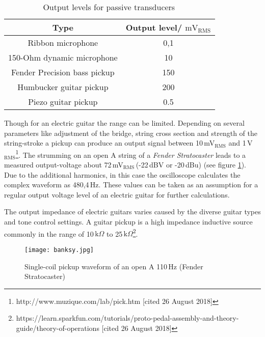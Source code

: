 \begin{table}[H]
\begin{center}
\begin{tabular}{|c|c|}
\hline 
\textbf{Type} & \textbf{Output level/ $\mathrm{mV}_{\mathrm{RMS}}$} \\ 
\hline 
\hline
Ribbon microphone & 0,1 \\ 
\hline 
150-Ohm dynamic microphone & 10 \\ 
\hline 
Fender Precision bass pickup & 150 \\ 
\hline 
Humbucker guitar pickup & 200 \\ 
\hline 
Piezo guitar pickup & 0.5 \\ 
\hline 
\end{tabular} 
\caption{Output levels for passive transducers\,\cite{Winer:2012}}
\end{center}
\label{tab:LineLevels}
\end{table}


Though for an electric guitar the range can be limited.
Depending on several parameters like adjustment of the bridge, string cross section and strength of the string-stroke a pickup can produce an output signal between 10\,mV$_{\mathrm{RMS}}$ and 1\,V$_{\mathrm{RMS}}$\footnote{http://www.muzique.com/lab/pick.htm [cited 26 August 2018]}.
The strumming on an open A string of a \textit{Fender Stratocaster} leads to a measured output-voltage about 72\,mV$_{\mathrm{RMS}}$\,(-22\,dBV or -20\,dBu) (see figure \ref{fig:singleCoilVoltage}). Due to the additional harmonics, in this case the oscilloscope calculates the complex waveform as 480,4\,Hz. 
These values can be taken as an assumption for a regular output voltage level of an electric guitar for further calculations.


The output impedance of electric guitars varies caused by the diverse guitar types and tone control settings.
A guitar pickup is a high impedance inductive source commonly in the range of 10\,$\mathrm{k}\Omega$ to 25\,$\mathrm{k}\Omega$\footnote{https://learn.sparkfun.com/tutorials/proto-pedal-assembly-and-theory-guide/theory-of-operations [cited 26 August 2018]}.


\begin{figure}[H]
	\centering \texttt{[image: banksy.jpg]}
	\caption[singleCoilVoltage]{Single-coil pickup waveform of an open A 110\,Hz (Fender Stratocaster)\,\cite[p.\,27]{Dailey:2014}}
	\label{fig:singleCoilVoltage}
\end{figure}

